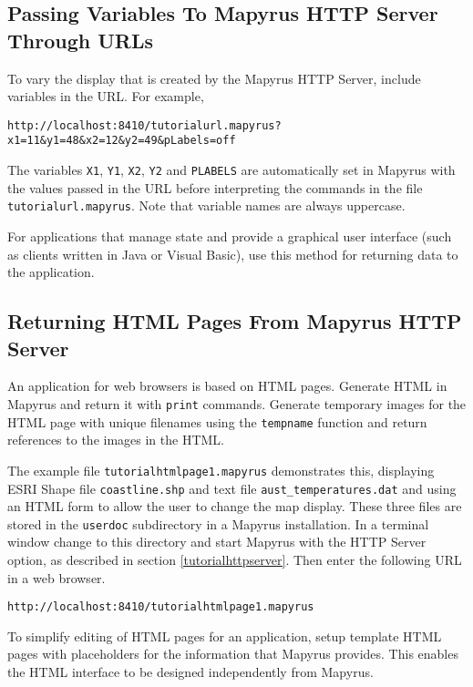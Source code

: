 \subsection{Passing Variables To Mapyrus HTTP Server Through URLs}

To vary the display that is created by the Mapyrus HTTP Server, include
variables in the URL.  For example,

\begin{verbatim}
http://localhost:8410/tutorialurl.mapyrus?x1=11&y1=48&x2=12&y2=49&pLabels=off
\end{verbatim}

The variables \texttt{X1}, \texttt{Y1}, \texttt{X2}, \texttt{Y2}
and \texttt{PLABELS} are automatically set in Mapyrus with the values
passed in the URL before interpreting
the commands in the file \texttt{tutorialurl.mapyrus}.
Note that variable names are always uppercase.

For applications that manage state
and provide a graphical user interface (such as clients written in
Java or Visual Basic), use this method for returning data to the
application.

\subsection{Returning HTML Pages From Mapyrus HTTP Server}

An application for web browsers is based on HTML pages.
Generate HTML in Mapyrus and return it with \texttt{print} commands.
Generate temporary images for the HTML page with
unique filenames using the
\texttt{tempname}
function and return references to the images in the HTML.

The example file \texttt{tutorialhtmlpage1.mapyrus} demonstrates
this, displaying ESRI Shape file
\texttt{coastline.shp}
and text file
\texttt{aust\_temperatures.dat}
and using an HTML form to allow
the user to change the map display.
These three files are stored in the \texttt{userdoc} subdirectory
in a Mapyrus installation.
In a terminal window change to this directory and
start Mapyrus with the HTTP Server option, as described in section
\ref{tutorialhttpserver}.
Then enter the following URL in a web browser.

\begin{verbatim}
http://localhost:8410/tutorialhtmlpage1.mapyrus
\end{verbatim}

To simplify editing of HTML pages for an application, setup
template HTML pages with placeholders for the information that
Mapyrus provides.  This enables the HTML interface to be designed
independently from Mapyrus.

